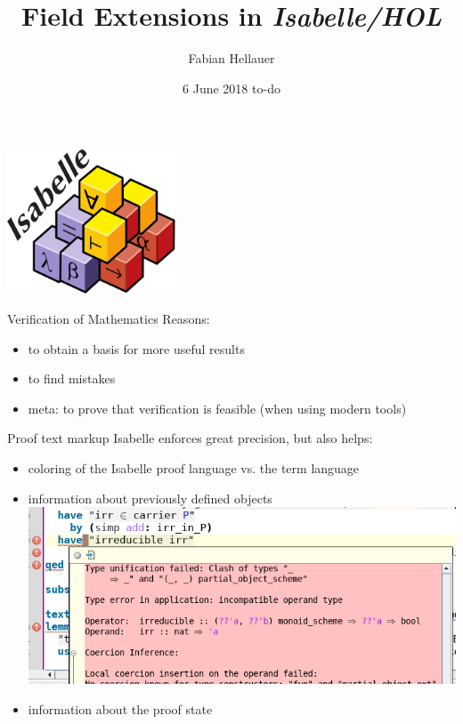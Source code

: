 \documentclass[%
	sans,
	12pt,
]{beamer}
\title{Field Extensions in \emph{Isabelle/HOL} \vspace*{-0.5em}}
\author{\normalsize Fabian Hellauer}
\institute[]{\footnotesize Technische Universität München}
\date{\footnotesize 6 June 2018 to-do}
\begin{document}
\maketitle

\begin{frame}
\begin{center}
\includegraphics[width=5cm]{isabelle.pdf}
\end{center}
\end{frame}


\newcommand{\pivot}[1]{{\color{red}#1}}
\newcommand{\ltpiv}[1]{{\color{blue}#1}}
\newcommand{\gtpiv}[1]{{\color{olive}#1}}

\begin{frame}{Verification of Mathematics}%
Reasons:
\begin{itemize}
	\item to obtain a basis for more useful results\pause
	\item to find mistakes\pause
	\item meta: to prove that verification %
	is feasible (when using modern tools)
\end{itemize}
\end{frame}

\begin{frame}{Proof text markup}
Isabelle enforces great precision, but also helps:
\begin{itemize}
	\item coloring of the Isabelle proof language vs. the term language\pause
	\item information about previously defined objects \pause
	\includegraphics[width=0.7\linewidth]{"type_error"}
	\item information about the proof state%
\end{itemize}
\end{frame}
\end{document}
